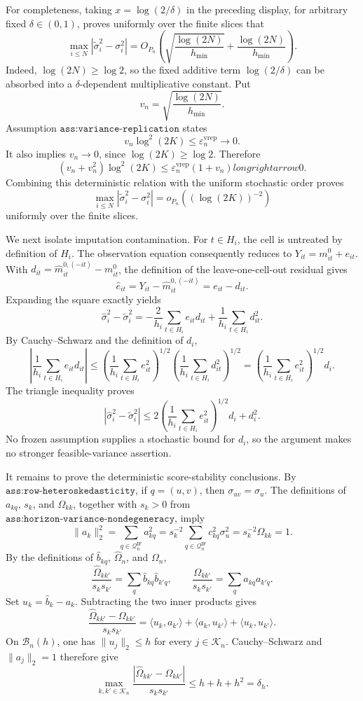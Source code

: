 For completeness, taking \(x=\log(2/\delta)\) in the preceding display,
for arbitrary fixed \(\delta\in(0,1)\), proves uniformly over the finite
slices that
\[
 \max_{i\le N}|\widetilde\sigma_i^2-\sigma_i^2|
 =O_{P_n}\!\left(
 \sqrt{\frac{\log(2N)}{h_{\min}}}
 +\frac{\log(2N)}{h_{\min}}
 \right).
\]
Indeed, \(\log(2N)\ge\log2\), so the fixed additive term
\(\log(2/\delta)\) can be absorbed into a \(\delta\)-dependent
multiplicative constant.  Put
\[
 v_n=\sqrt{\frac{\log(2N)}{h_{\min}}}.
\]
Assumption \(\texttt{ass:variance-replication}\) states
\[
 v_n\log^2(2K)\le\varepsilon_n^{\mathrm{vrep}}\longrightarrow0.
\]
It also implies \(v_n\to0\), since \(\log(2K)\ge\log2\).  Therefore
\[
 (v_n+v_n^2)\log^2(2K)
 \le \varepsilon_n^{\mathrm{vrep}}(1+v_n)longrightarrow0.
\]
Combining this deterministic relation with the uniform stochastic order
proves
\[
 \max_{i\le N}|\widetilde\sigma_i^2-\sigma_i^2|
 =o_{P_n}((\log(2K))^{-2})
\]
uniformly over the finite slices.

We next isolate imputation contamination.  For \(t\in H_i\), the cell is
untreated by definition of \(H_i\).  The observation equation consequently
reduces to \(Y_{it}=m^0_{it}+e_{it}\).  With
\(d_{it}=\widehat m_{it}^{0,(-it)}-m^0_{it}\), the definition of the
leave-one-cell-out residual gives
\[
 \widehat e_{it}=Y_{it}-\widehat m_{it}^{0,(-it)}=e_{it}-d_{it}.
\]
Expanding the square exactly yields
\[
 \widehat\sigma_i^2-\widetilde\sigma_i^2
 =-\frac2{h_i}\sum_{t\in H_i}e_{it}d_{it}
 +\frac1{h_i}\sum_{t\in H_i}d_{it}^2.
\]
By Cauchy--Schwarz and the definition of \(d_i\),
\[
 \left|\frac1{h_i}\sum_{t\in H_i}e_{it}d_{it}\right|
 \le
 \left(\frac1{h_i}\sum_{t\in H_i}e_{it}^2\right)^{1/2}
 \left(\frac1{h_i}\sum_{t\in H_i}d_{it}^2\right)^{1/2}
 =\left(\frac1{h_i}\sum_{t\in H_i}e_{it}^2\right)^{1/2}d_i.
\]
The triangle inequality proves
\[
 |\widehat\sigma_i^2-\widetilde\sigma_i^2|
 \le2\left(\frac1{h_i}\sum_{t\in H_i}e_{it}^2\right)^{1/2}d_i+d_i^2.
\]
No frozen assumption supplies a stochastic bound for \(d_i\), so the
argument makes no stronger feasible-variance assertion.

It remains to prove the deterministic score-stability conclusions.  By
\(\texttt{ass:row-heteroskedasticity}\), if \(q=(u,v)\), then
\(\sigma_{uv}=\sigma_u\).  The definitions of \(a_{kq}\), \(s_k\), and
\(\Omega_{kk}\), together with \(s_k>0\) from
\(\texttt{ass:horizon-variance-nondegeneracy}\), imply
\[
 \|a_k\|_2^2
 =\sum_{q\in\mathcal Q_n^{\mathrm{IF}}}a_{kq}^2
 =s_k^{-2}\sum_{q\in\mathcal Q_n^{\mathrm{IF}}}c_{kq}^2\sigma_u^2
 =s_k^{-2}\Omega_{kk}=1.
\]
By the definitions of \(\widehat b_{kq}\), \(\widehat\Omega_n\), and
\(\Omega_n\),
\[
 \frac{\widehat\Omega_{kk'}}{s_ks_{k'}}
 =\sum_q\widehat b_{kq}\widehat b_{k'q},
 \qquad
 \frac{\Omega_{kk'}}{s_ks_{k'}}
 =\sum_qa_{kq}a_{k'q}.
\]
Set \(u_k=\widehat b_k-a_k\).  Subtracting the two inner products gives
\[
 \frac{\widehat\Omega_{kk'}-\Omega_{kk'}}{s_ks_{k'}}
 =\langle u_k,a_{k'}\rangle
 +\langle a_k,u_{k'}\rangle
 +\langle u_k,u_{k'}\rangle.
\]
On \(\mathcal B_n(h)\), one has \(\|u_j\|_2\le h\) for every
\(j\in\mathcal K_n\).  Cauchy--Schwarz and \(\|a_j\|_2=1\) therefore
give
\[
 \max_{k,k'\in\mathcal K_n}
 \frac{|\widehat\Omega_{kk'}-\Omega_{kk'}|}{s_ks_{k'}}
 \le h+h+h^2=\delta_h.
\]

